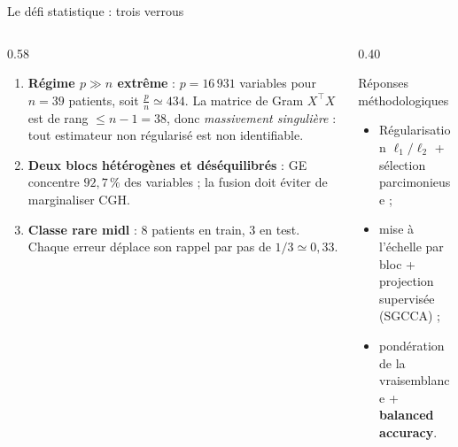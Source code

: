 \documentclass[aspectratio=169, 10pt]{beamer}
\begin{document}
\begin{frame}{Le défi statistique : trois verrous}
  \begin{columns}[T]
    \begin{column}{0.58\textwidth}
      \begin{enumerate}
        \item \textbf{Régime $p \gg n$ extrême} : $p = 16\,931$ variables pour $n = 39$ patients, soit $\frac{p}{n} \simeq 434$. La matrice de Gram $X^\top X$ est de rang $\le n - 1 = 38$, donc \emph{massivement singulière} : tout estimateur non régularisé est non identifiable.
        \item \textbf{Deux blocs hétérogènes et déséquilibrés} : GE concentre $92{,}7\,\%$ des variables ; la fusion doit éviter de marginaliser CGH.
        \item \textbf{Classe rare midl} : 8 patients en train, 3 en test. Chaque erreur déplace son rappel par pas de $1/3 \simeq 0{,}33$.
      \end{enumerate}
    \end{column}

    \begin{column}{0.40\textwidth}
      \begin{block}{Réponses méthodologiques}
        \begin{itemize}
          \item Régularisation $\ell_1 /\ell_2$ + sélection parcimonieuse ;
          \item mise à l’échelle par bloc + projection supervisée (SGCCA) ;
          \item pondération de la vraisemblance + \textbf{balanced accuracy}.
        \end{itemize}
      \end{block}
    \end{column}
  \end{columns}

  \vfill
  \begin{center}
  \end{center}
\end{frame}
\end{document}
